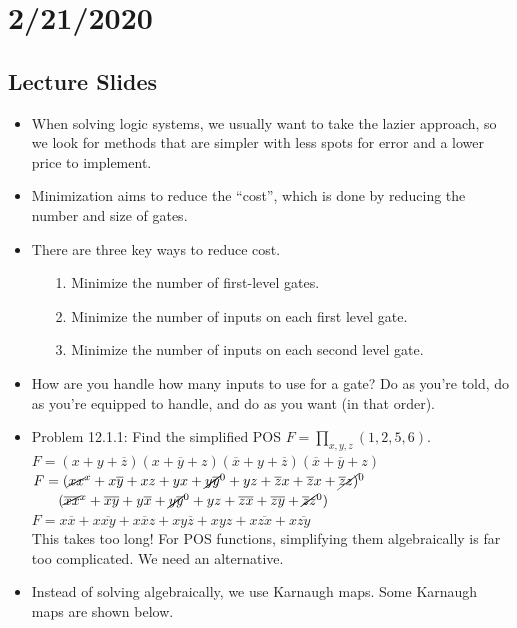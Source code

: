 \documentclass[10pt,a4paper]{article}
\newcommand{\ol}[1]{\overline{#1}}
\begin{document}
\section{2/21/2020}
\subsection{Lecture Slides}
\begin{itemize}
\item When solving logic systems, we usually want to take the lazier approach, so we look for methods that are simpler with less spots for error and a lower price to implement. 
\item Minimization aims to reduce the ``cost'', which is done by reducing the number and size of gates.
\item There are three key ways to reduce cost.
\begin{enumerate}
\item [1.] Minimize the number of first-level gates.
\item [2.] Minimize the number of inputs on each first level gate.
\item [3.] Minimize the number of inputs on each second level gate. 
\end{enumerate}
\item How are you handle how many inputs to use for a gate? Do as you're told, do as you're equipped to handle, and do as you want (in that order). 
\item Problem 12.1.1: Find the simplified POS $F=\prod_{x,y,z}(1,2,5,6)$.\\
$F=(x+y+\ol{z})(x+\ol{y}+z)(\ol{x}+y+\ol{z})(\ol{x}+\ol{y}+z)$\\
$F=(\cancel{xx}^x+x\ol{y}+xz+yx+\cancel{y\ol{y}}^0+yz+\ol{z}x+\ol{z}x+\cancel{\ol{z}z)}^0$\\
$\textcolor{white}{F=}(\cancel{\ol{xx}}^x+\ol{xy}+y\ol{x}+\cancel{y\ol{y}}^0+yz+\ol{zx}+\ol{zy}+\cancel{\ol{z}z}^0)$\\
$F=x\ol{x}+x\ol{xy}+x\ol{x}z+xy\ol{z}+xyz+x\ol{zx}+x\ol{zy}$\\
This takes too long! For POS functions, simplifying them algebraically is far too complicated. We need an alternative. 
\item Instead of solving algebraically, we use Karnaugh maps. Some Karnaugh maps are shown below.\\
\\

\end{itemize}
\end{document}
